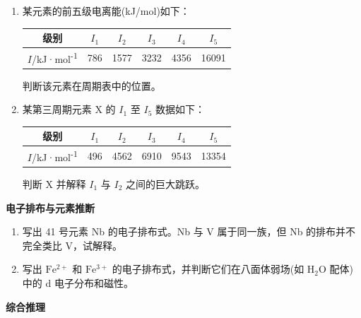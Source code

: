 \begin{enumerate}
\def\labelenumi{\arabic{enumi}.}
\setcounter{enumi}{15}
\item
  某元素的前五级电离能(kJ/mol)如下：

  {\def\LTcaptype{none} %
  \begin{longtable}[]{@{}cccccc@{}}
  \toprule\noalign{}
  级别 & \(I_1\) & \(I_2\) & \(I_3\) & \(I_4\) & \(I_5\) \\
  \midrule\noalign{}
  \endhead
  \bottomrule\noalign{}
  \endlastfoot
  \(I\)/kJ·mol\textsuperscript{-1} & 786 & 1577 & 3232 & 4356 & 16091 \\
  \end{longtable}
  }

  判断该元素在周期表中的位置。
\item
  某第三周期元素 X 的 \(I_1\) 至 \(I_5\) 数据如下：

  {\def\LTcaptype{none} %
  \begin{longtable}[]{@{}cccccc@{}}
  \toprule\noalign{}
  级别 & \(I_1\) & \(I_2\) & \(I_3\) & \(I_4\) & \(I_5\) \\
  \midrule\noalign{}
  \endhead
  \bottomrule\noalign{}
  \endlastfoot
  \(I\)/kJ·mol\textsuperscript{-1} & 496 & 4562 & 6910 & 9543 & 13354 \\
  \end{longtable}
  }

  判断 X 并解释 \(I_1\) 与 \(I_2\) 之间的巨大跳跃。
\end{enumerate}

\textbf{电子排布与元素推断}

\begin{enumerate}
\def\labelenumi{\arabic{enumi}.}
\setcounter{enumi}{17}
\item
  写出 41 号元素 Nb 的电子排布式。Nb 与 V 属于同一族，但 Nb 的排布并不完全类比 V，试解释。
\item
  写出 \(\mathrm{Fe^{2+}}\) 和 \(\mathrm{Fe^{3+}}\) 的电子排布式，并判断它们在八面体弱场(如 \(\mathrm{H_2O}\) 配体)中的 d 电子分布和磁性。
\end{enumerate}

\textbf{综合推理}


